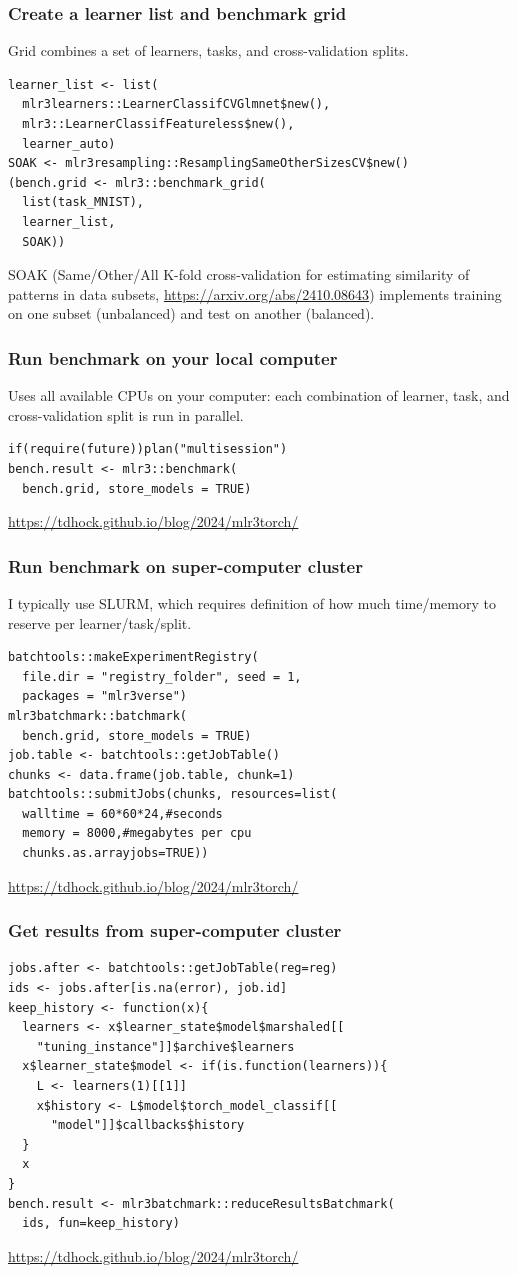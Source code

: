 \documentclass{beamer}
\begin{document}
\begin{frame}[fragile]
  \frametitle{Create a learner list and benchmark grid}
  Grid combines a set of learners, tasks, and cross-validation splits.
\begin{verbatim}
learner_list <- list(
  mlr3learners::LearnerClassifCVGlmnet$new(),
  mlr3::LearnerClassifFeatureless$new(),
  learner_auto)
SOAK <- mlr3resampling::ResamplingSameOtherSizesCV$new()
(bench.grid <- mlr3::benchmark_grid(
  list(task_MNIST),
  learner_list,
  SOAK))
\end{verbatim}
  SOAK (Same/Other/All K-fold cross-validation for estimating
  similarity of patterns in data subsets,
  \url{https://arxiv.org/abs/2410.08643}) implements training on one
  subset (unbalanced) and test on another (balanced).
\end{frame}

\begin{frame}[fragile]
  \frametitle{Run benchmark on your local computer} Uses all available
  CPUs on your computer: each combination of learner, task, and
  cross-validation split is run in parallel.
\begin{verbatim}
if(require(future))plan("multisession")
bench.result <- mlr3::benchmark(
  bench.grid, store_models = TRUE)
\end{verbatim}
  \url{https://tdhock.github.io/blog/2024/mlr3torch/}
\end{frame}

\begin{frame}[fragile]
  \frametitle{Run benchmark on super-computer cluster} I typically use
  SLURM, which requires definition of how much time/memory to reserve
  per learner/task/split.
\begin{verbatim}
batchtools::makeExperimentRegistry(
  file.dir = "registry_folder", seed = 1,
  packages = "mlr3verse")
mlr3batchmark::batchmark(
  bench.grid, store_models = TRUE)
job.table <- batchtools::getJobTable()
chunks <- data.frame(job.table, chunk=1)
batchtools::submitJobs(chunks, resources=list(
  walltime = 60*60*24,#seconds
  memory = 8000,#megabytes per cpu
  chunks.as.arrayjobs=TRUE))
\end{verbatim}
  \url{https://tdhock.github.io/blog/2024/mlr3torch/}
\end{frame}

\begin{frame}[fragile]
  \frametitle{Get results from super-computer cluster}
\begin{verbatim}
jobs.after <- batchtools::getJobTable(reg=reg)
ids <- jobs.after[is.na(error), job.id]
keep_history <- function(x){
  learners <- x$learner_state$model$marshaled[[
    "tuning_instance"]]$archive$learners
  x$learner_state$model <- if(is.function(learners)){
    L <- learners(1)[[1]]
    x$history <- L$model$torch_model_classif[[
      "model"]]$callbacks$history
  }
  x
}
bench.result <- mlr3batchmark::reduceResultsBatchmark(
  ids, fun=keep_history)
\end{verbatim}
  \url{https://tdhock.github.io/blog/2024/mlr3torch/}
\end{frame}
\end{document}
